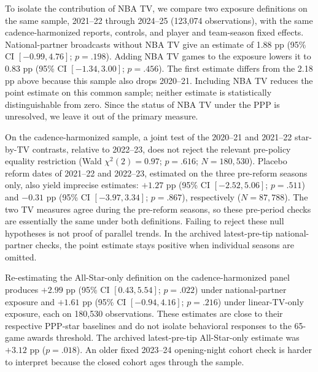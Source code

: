\documentclass[11pt]{article}
\begin{document}
To isolate the contribution of NBA TV, we compare two exposure definitions on the same sample, 2021--22 through 2024--25 (123,074 observations), with the same cadence-harmonized reports, controls, and player and team-season fixed effects. National-partner broadcasts without NBA TV give an estimate of 1.88 pp (95\% CI $[-0.99,4.76]$; $p = .198$). Adding NBA TV games to the exposure lowers it to 0.83 pp (95\% CI $[-1.34,3.00]$; $p = .456$). The first estimate differs from the 2.18 pp above because this sample also drops 2020--21. Including NBA TV reduces the point estimate on this common sample; neither estimate is statistically distinguishable from zero. Since the status of NBA TV under the PPP is unresolved, we leave it out of the primary measure.

On the cadence-harmonized sample, a joint test of the 2020--21 and 2021--22 star-by-TV contrasts, relative to 2022--23, does not reject the relevant pre-policy equality restriction (Wald $\chi^2(2)=0.97$; $p = .616$; $N=180{,}530$). Placebo reform dates of 2021--22 and 2022--23, estimated on the three pre-reform seasons only, also yield imprecise estimates: $+1.27$ pp (95\% CI $[-2.52,5.06]$; $p = .511$) and $-0.31$ pp (95\% CI $[-3.97,3.34]$; $p = .867$), respectively ($N=87{,}788$). The two TV measures agree during the pre-reform seasons, so these pre-period checks are essentially the same under both definitions. Failing to reject these null hypotheses is not proof of parallel trends. In the archived latest-pre-tip national-partner checks, the point estimate stays positive when individual seasons are omitted.

Re-estimating the All-Star-only definition on the cadence-harmonized panel produces $+2.99$ pp (95\% CI $[0.43,5.54]$; $p = .022$) under national-partner exposure and $+1.61$ pp (95\% CI $[-0.94,4.16]$; $p = .216$) under linear-TV-only exposure, each on 180,530 observations. These estimates are close to their respective PPP-star baselines and do not isolate behavioral responses to the 65-game awards threshold. The archived latest-pre-tip All-Star-only estimate was $+3.12$ pp ($p = .018$). An older fixed 2023--24 opening-night cohort check is harder to interpret because the closed cohort ages through the sample.
\end{document}
